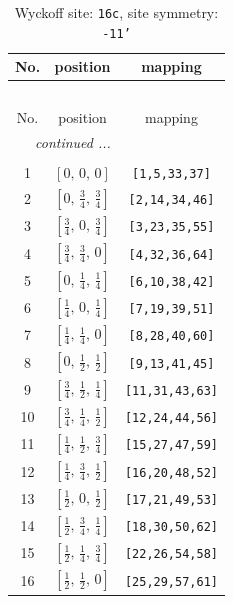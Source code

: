 \documentclass[fleqn,8pt]{jsarticle}
\begin{document}
\begin{longtable}{ccc}
\caption{Wyckoff site: {\tt 16c}, site symmetry: {\tt -11'}}
 \\
 \hline \hline
No. & position & mapping \\ \hline \endfirsthead

\multicolumn{2}{l}{\tablename\ \thetable{}} \\
 \hline \hline
No. & position & mapping \\ \hline \endhead

 \hline \hline
\multicolumn{2}{r}{\footnotesize\it continued ...} \\ \endfoot

 \hline \hline
\multicolumn{2}{r}{} \\ \endlastfoot

1 & $\left[ 0,\, 0,\, 0 \right]$ & {\tt [1,5,33,37]} \\ \hline
2 & $\left[ 0,\, \frac{3}{4},\, \frac{3}{4} \right]$ & {\tt [2,14,34,46]} \\ \hline
3 & $\left[ \frac{3}{4},\, 0,\, \frac{3}{4} \right]$ & {\tt [3,23,35,55]} \\ \hline
4 & $\left[ \frac{3}{4},\, \frac{3}{4},\, 0 \right]$ & {\tt [4,32,36,64]} \\ \hline
5 & $\left[ 0,\, \frac{1}{4},\, \frac{1}{4} \right]$ & {\tt [6,10,38,42]} \\ \hline
6 & $\left[ \frac{1}{4},\, 0,\, \frac{1}{4} \right]$ & {\tt [7,19,39,51]} \\ \hline
7 & $\left[ \frac{1}{4},\, \frac{1}{4},\, 0 \right]$ & {\tt [8,28,40,60]} \\ \hline
8 & $\left[ 0,\, \frac{1}{2},\, \frac{1}{2} \right]$ & {\tt [9,13,41,45]} \\ \hline
9 & $\left[ \frac{3}{4},\, \frac{1}{2},\, \frac{1}{4} \right]$ & {\tt [11,31,43,63]} \\ \hline
10 & $\left[ \frac{3}{4},\, \frac{1}{4},\, \frac{1}{2} \right]$ & {\tt [12,24,44,56]} \\ \hline
11 & $\left[ \frac{1}{4},\, \frac{1}{2},\, \frac{3}{4} \right]$ & {\tt [15,27,47,59]} \\ \hline
12 & $\left[ \frac{1}{4},\, \frac{3}{4},\, \frac{1}{2} \right]$ & {\tt [16,20,48,52]} \\ \hline
13 & $\left[ \frac{1}{2},\, 0,\, \frac{1}{2} \right]$ & {\tt [17,21,49,53]} \\ \hline
14 & $\left[ \frac{1}{2},\, \frac{3}{4},\, \frac{1}{4} \right]$ & {\tt [18,30,50,62]} \\ \hline
15 & $\left[ \frac{1}{2},\, \frac{1}{4},\, \frac{3}{4} \right]$ & {\tt [22,26,54,58]} \\ \hline
16 & $\left[ \frac{1}{2},\, \frac{1}{2},\, 0 \right]$ & {\tt [25,29,57,61]} \\
\end{longtable}
\end{document}
